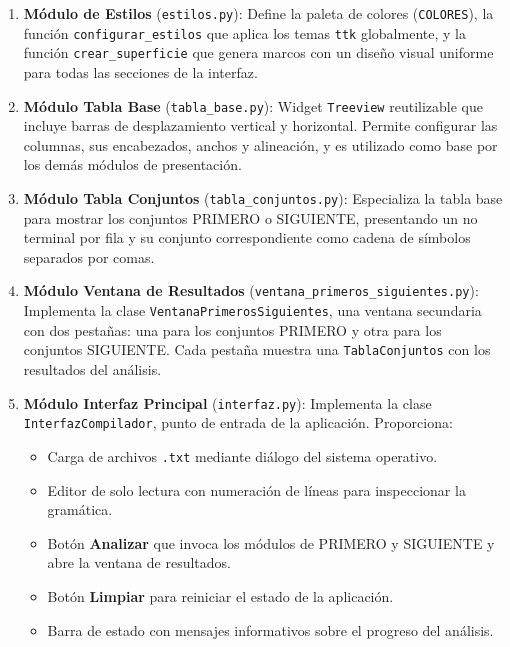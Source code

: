 \begin{enumerate}
  \item \textbf{Módulo de Estilos} (\texttt{estilos.py}): Define la paleta de colores
    (\texttt{COLORES}), la función \texttt{configurar\_estilos} que aplica los temas
    \texttt{ttk} globalmente, y la función \texttt{crear\_superficie} que genera marcos con
    un diseño visual uniforme para todas las secciones de la interfaz.

  \item \textbf{Módulo Tabla Base} (\texttt{tabla\_base.py}): Widget \texttt{Treeview}
    reutilizable que incluye barras de desplazamiento vertical y horizontal. Permite
    configurar las columnas, sus encabezados, anchos y alineación, y es utilizado como
    base por los demás módulos de presentación.

  \item \textbf{Módulo Tabla Conjuntos} (\texttt{tabla\_conjuntos.py}): Especializa la tabla
    base para mostrar los conjuntos PRIMERO o SIGUIENTE, presentando un no terminal por
    fila y su conjunto correspondiente como cadena de símbolos separados por comas.

  \item \textbf{Módulo Ventana de Resultados} (\texttt{ventana\_primeros\_siguientes.py}):
    Implementa la clase \texttt{VentanaPrimerosSiguientes}, una ventana secundaria con dos
    pestañas: una para los conjuntos PRIMERO y otra para los conjuntos SIGUIENTE. Cada pestaña
    muestra una \texttt{TablaConjuntos} con los resultados del análisis.

  \item \textbf{Módulo Interfaz Principal} (\texttt{interfaz.py}): Implementa la clase
    \texttt{InterfazCompilador}, punto de entrada de la aplicación. Proporciona:
    \begin{itemize}
      \item Carga de archivos \texttt{.txt} mediante diálogo del sistema operativo.
      \item Editor de solo lectura con numeración de líneas para inspeccionar la gramática.
      \item Botón \textbf{Analizar} que invoca los módulos de PRIMERO y SIGUIENTE y abre la
            ventana de resultados.
      \item Botón \textbf{Limpiar} para reiniciar el estado de la aplicación.
      \item Barra de estado con mensajes informativos sobre el progreso del análisis.
    \end{itemize}
\end{enumerate}
